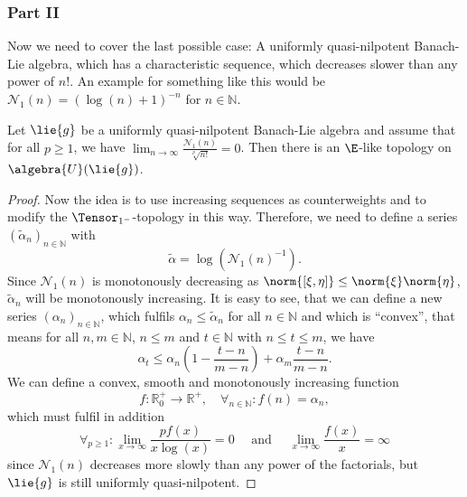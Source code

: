 \documentclass[
11pt,                          %
english                        %
]{article}
\begin{document}
\subsubsection{Part II}
Now we need to cover the last possible case: A uniformly quasi-nilpotent Banach-Lie 
algebra, which has a characteristic sequence, which decreases slower than any power 
of $n!$. An example for something like this would be $\mathcal{N}_1(n) = 
(\log(n) + 1)^{-n}$ for $n \in \mathbb{N}$.
\begin{proposition}
	Let $\lie{g}$ be a uniformly quasi-nilpotent Banach-Lie algebra and assume that 
	for all $p \geq 1$, we have $\lim_{n \rightarrow \infty} 
	\frac{\mathcal{N}_1(n)}{\sqrt[p]{n!}} = 0$. Then there is an $\E$-like topology 
	on $\algebra{U}(\lie{g})$.
\end{proposition}
\begin{proof}
	Now the idea is to use increasing sequences as counterweights and to modify the 
	$\Tensor_{1^-}$-topology in this way. Therefore, we need 
	to define a series $(\widetilde{\alpha}_n)_{n \in \mathbb{N}}$ with
	\begin{equation*}
		\widetilde{\alpha}
		=
		\log \left(
			\mathcal{N}_1(n)^{-1}
		\right).
	\end{equation*}
	Since $\mathcal{N}_1(n)$ is monotonously decreasing as $\norm{[\xi, \eta]} \leq 
	\norm{\xi} \norm{\eta}$, $\widetilde{\alpha}_n$ will be monotonously increasing.
	It is easy to see, that we can define a new series $(\alpha_n)_{n \in 
	\mathbb{N}}$, which fulfils $\alpha_n \leq \widetilde{\alpha}_n$ for all $n \in 
	\mathbb{N}$ and which is ``convex'', that means for all $n, m \in \mathbb{N}$, 
	$n \leq m$ and $t \in \mathbb{N}$ with $n \leq t \leq m$, we have
	\begin{equation*}
		\alpha_t 
		\leq 
		\alpha_n \left( 1 - \frac{t - n}{m - n} \right) + 
		\alpha_m \frac{t - n}{m - n}.
	\end{equation*}
	We can define a convex, smooth and monotonously increasing function
	\begin{equation*}
		f \colon
		\mathbb{R}_0^+
		\longrightarrow
		\mathbb{R}^+
		, \quad
		\forall_{n \in \mathbb{N}}
		\colon
		f(n) 
		=
		\alpha_n,
	\end{equation*}
	which must fulfil in addition
	\begin{equation*}
		\forall_{p \geq 1}
		\colon
		\lim_{x \rightarrow \infty}
		\frac{p f(x)}{x \log(x)}
		=
		0
		\quad \text{ and } \quad
		\lim_{x \rightarrow \infty}
		\frac{f(x)}{x}
		=
		\infty
	\end{equation*}
	since $\mathcal{N}_1(n)$ decreases more slowly than any power of the factorials, 
	but $\lie{g}$ is still uniformly quasi-nilpotent.
	

\end{proof}
\end{document}
